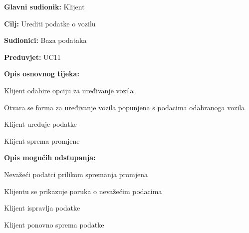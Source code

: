 \noindent {}
\begin{packed_item}
	
	\item \textbf{Glavni sudionik:} Klijent
	\item \textbf{Cilj:} Urediti podatke o vozilu
	\item \textbf{Sudionici:} Baza podataka
	\item \textbf{Preduvjet:} UC11
	\item \textbf{Opis osnovnog tijeka:}
	
	\item[] \begin{packed_enum}
		
		\item Klijent odabire opciju za uređivanje vozila
		\item Otvara se forma za uređivanje vozila popunjena s podacima odabranoga vozila
		\item Klijent uređuje podatke
		\item Klijent sprema promjene
	
	\end{packed_enum}
	
	\item  \textbf{Opis mogućih odstupanja:}
	
	\item[] \begin{packed_item}
		
		\item[6.a] Nevažeći podatci prilikom spremanja promjena
		\item[] \begin{packed_enum}
			
			\item Klijentu se prikazuje poruka o nevažećim podacima
			\item Klijent ispravlja podatke
			\item Klijent ponovno sprema podatke
			
		\end{packed_enum}
		
	\end{packed_item}

\end{packed_item}

